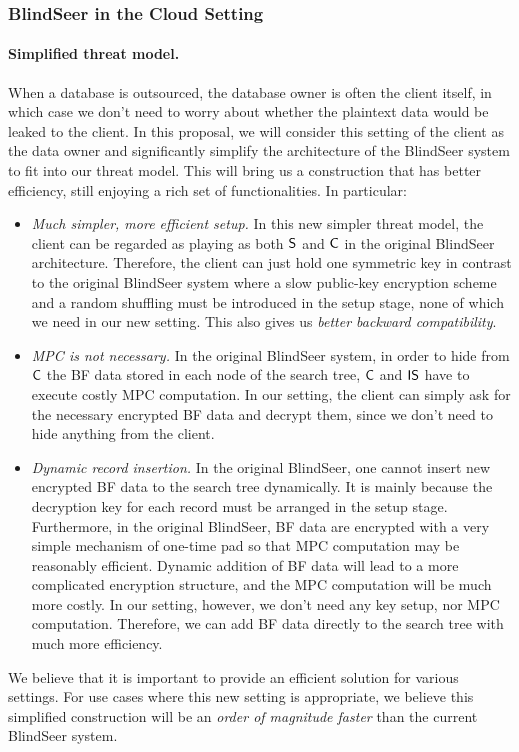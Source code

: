
\subsubsection{BlindSeer in the Cloud Setting}
\label{sec:ext-blindseer}
\paragraph{Simplified threat model.}
When a database is outsourced, the database owner is often the client
itself, in which case we don't need to worry about whether the plaintext data
would be leaked to the client.  In this proposal, we will consider this setting
of the client as the data owner and significantly simplify the architecture of
the BlindSeer system to fit into our threat model. This will bring us a
construction that has better efficiency, still enjoying a rich set of
functionalities. In particular:

\begin{itemize}\setlength\itemsep{0em}
\item {\em Much simpler, more efficient setup.}
In this new simpler threat model, the client can be regarded as playing as both
$\sf S$ and $\sf C$ in the original BlindSeer architecture. Therefore, the
client can just hold one symmetric key in contrast to the original BlindSeer
system where a slow public-key encryption scheme and a random shuffling
must be introduced in the setup stage, none of which we need in our new
setting. This also gives us {\em better backward compatibility}.

\item {\em MPC is not necessary.} In the original BlindSeer system, in order to
hide from $\sf C$ the BF data stored in each node of the search tree, $\sf
C$ and $\sf IS$ have to execute costly MPC computation. In our setting, the
    client can simply ask for the necessary encrypted BF data and decrypt them,
    since we don't need to hide anything from the client.  


\item {\em Dynamic record insertion.} In the original BlindSeer, one cannot
insert new encrypted BF data to the search tree dynamically.  It is mainly
because the decryption key for each record must be arranged in the setup
stage.
%
Furthermore, in the original BlindSeer, BF data are encrypted with a very
simple mechanism of one-time pad so that MPC computation may be reasonably
efficient. Dynamic addition of BF data will lead to a more complicated
encryption structure, and the MPC computation will be much more costly.
In our setting, however, we don't need any key setup, nor MPC computation.
Therefore, we can add BF data directly to the search tree with much more
efficiency.  
\end{itemize}
%
We believe that it is important to provide an efficient solution for
various settings. For use cases where this new setting is appropriate, we
believe this simplified construction will be an {\em order of magnitude faster}
than the current BlindSeer system.

